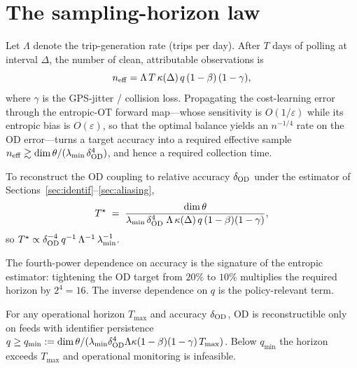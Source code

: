 \section{The sampling-horizon law}
\label{sec:horizon}

Let $\Lambda$ denote the trip-generation rate (trips per day). After $T$ days of
polling at interval $\Delta$, the number of clean, attributable observations is
\begin{equation}
\label{eq:neff}
n_{\mathrm{eff}} = \Lambda\,T\,\kappa(\Delta)\,q\,(1-\beta)\,(1-\gamma),
\end{equation}
where $\gamma$ is the GPS-jitter / collision loss. Propagating the cost-learning
error through the entropic-OT forward map---whose sensitivity is $O(1/\varepsilon)$
while its entropic bias is $O(\varepsilon)$, so that the optimal balance yields an
$n^{-1/4}$ rate on the OD error---turns a target accuracy into a required
effective sample $n_{\mathrm{eff}}\gtrsim \dim\theta/(\lambda_{\min}\,\delta_{\mathrm{OD}}^{4})$, and
hence a required collection time.

\begin{theorem}
\label{thm:horizon}
To reconstruct the OD coupling to relative accuracy $\delta_{\mathrm{OD}}$ under the
estimator of Sections~\ref{sec:identif}--\ref{sec:aliasing},
\begin{equation}
\label{eq:Tstar}
T^{\star} \;=\;
\frac{\dim\theta}
     {\lambda_{\min}\,\delta_{\mathrm{OD}}^{4}\;\Lambda\,\kappa(\Delta)\,q\,(1-\beta)(1-\gamma)} ,
\end{equation}
so $T^{\star}\propto \delta_{\mathrm{OD}}^{-4}\,q^{-1}\,\Lambda^{-1}\,\lambda_{\min}^{-1}$.
\end{theorem}

The fourth-power dependence on accuracy is the signature of the entropic
estimator: tightening the OD target from $20\%$ to $10\%$ multiplies the required
horizon by $2^4=16$. The inverse dependence on $q$ is the policy-relevant term.

\begin{corollary}
\label{cor:threshold}
For any operational horizon $T_{\max}$ and accuracy $\delta_{\mathrm{OD}}$, OD is
reconstructible only on feeds with identifier persistence
$q \ge q_{\min}:=\dim\theta/(\lambda_{\min}\delta_{\mathrm{OD}}^4 \Lambda
\kappa(1-\beta)(1-\gamma)\,T_{\max})$. Below $q_{\min}$ the horizon exceeds
$T_{\max}$ and operational monitoring is infeasible.
\end{corollary}

